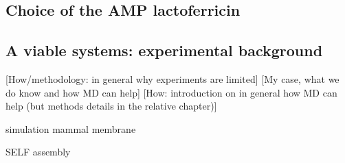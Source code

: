 \subsection{Choice of the AMP lactoferricin}

\subsection{A viable systems: experimental background}
[How/methodology: in general why experiments are limited]
[My case, what we do know and how MD can help]
[How: introduction on in general how MD can help (but methods details in the relative chapter)]
\clearpage





simulation mammal membrane \cite{Ingolfsson2014}

SELF assembly




